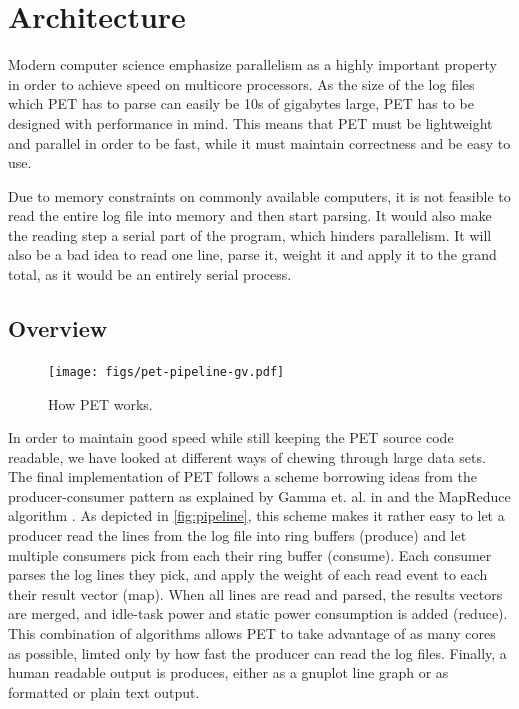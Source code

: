 \section{Architecture}

Modern computer science emphasize parallelism as a highly important property in
order to achieve speed on multicore processors. As the size of the log files
which PET has to parse can easily be 10s of gigabytes large, PET has to be
designed with performance in mind. This means that PET must be lightweight and
parallel in order to be fast, while it must maintain correctness and be easy to
use.

Due to memory constraints on commonly available computers, it is not feasible to
read the entire log file into memory and then start parsing. It would also make
the reading step a serial part of the program, which hinders parallelism. It
will also be a bad idea to read one line, parse it, weight it and apply it to
the grand total, as it would be an entirely serial process.

\subsection{Overview}

\begin{figure}[ht]
    \texttt{[image: figs/pet-pipeline-gv.pdf]}
    \caption{How PET works.}
    \label{fig:pipeline}
\end{figure}

In order to maintain good speed while still keeping the PET source code
readable, we have looked at different ways of chewing through large data sets.
The final implementation of PET follows a scheme borrowing ideas from the
producer-consumer pattern as explained by Gamma et. al. in \cite{designpatterns}
and the MapReduce algorithm \cite{dean2008mapreduce}. As depicted in
\autoref{fig:pipeline}, this scheme makes it rather easy to let a producer read
the lines from the log file into ring buffers (produce) and let multiple
consumers pick from each their ring buffer (consume). Each consumer parses the log
lines they pick, and apply the weight of each read event to each their result
vector (map). When all lines are read and parsed, the results vectors are
merged, and idle-task power and static power consumption is added (reduce). This
combination of algorithms allows PET to take advantage of as many cores as
possible, limted only by how fast the producer can read the log files. Finally,
a human readable output is produces, either as a gnuplot line graph or as
formatted or plain text output.

